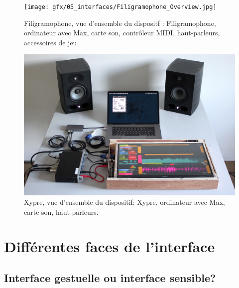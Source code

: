 \clearpage

\begin{figure}[!htbp]
	\captionsetup{format=plain}%
	\centering
	\begin{minipage}[t]{0.48\textwidth}
		\texttt{[image: gfx/05\_interfaces/Filigramophone\_Overview.jpg]}
		\caption[Filigramophone: vue d'ensemble]{Filigramophone, vue d'ensemble du dispositf : Filigramophone, ordinateur avec Max, carte son, contrôleur MIDI, haut-parleurs, accessoires de jeu.}
		\label{fig:interface:filigramophone_unplugged}
	\end{minipage}
	\hspace{.02\linewidth}
	\begin{minipage}[t]{0.48\textwidth}
	    \includegraphics[width=\linewidth]{gfx/05_interfaces/Xypre_Overview_144dpi.jpg}
		\caption[Xypre: vue d'ensemble]{Xypre, vue d'ensemble du dispositif: Xypre, ordinateur avec Max, carte son, haut-parleurs.}
		\label{fig:interface:xypre_unplugged}
	\end{minipage}
\end{figure}

\section{Différentes faces de l'interface}

\subsection{Interface gestuelle ou interface sensible?}



